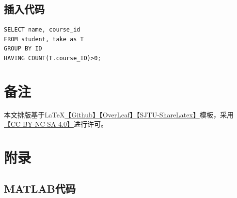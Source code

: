 \documentclass[a4paper]{article}
\begin{document}
\newpage
\subsection{插入代码}
\lstset{style=SQLStyle}
\begin{lstlisting}
SELECT name, course_id
FROM student, take as T
GROUP BY ID
HAVING COUNT(T.course_ID)>0;
\end{lstlisting}



\newpage
\section*{备注}
本文排版基于\LaTeX{}\href{https://github.com/JamesZhutheThird/A-Simple-LaTeX-Template}{【Github】}\href{https://cn.overleaf.com/read/mxmypkyfrzpz}{【OverLeaf】}\href{https://latex.sjtu.edu.cn/read/ndjrkpksrfzn}{【SJTU-ShareLatex】}模板，采用\href{http://creativecommons.org/licenses/by-nc-sa/4.0/}{【CC BY-NC-SA 4.0】}进行许可。





\section*{附录}
\subsection*{MATLAB代码}

\end{document}
